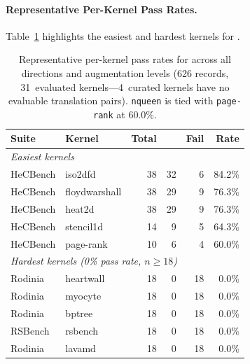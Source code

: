 \paragraph{Representative Per-Kernel Pass Rates.}
Table~\ref{tab:per-kernel-main} highlights the easiest and hardest kernels for \qwenshort{}.
\begin{table}[h]
\centering
\caption{Representative per-kernel pass rates for \qwenshort{} across all directions and augmentation levels (626 records, 31~evaluated kernels---4~curated kernels have no evaluable translation pairs). \texttt{nqueen} is tied with \texttt{page-rank} at 60.0\%.}
\label{tab:per-kernel-main}
\small
\begin{tabular}{@{}llrrrr@{}}
\toprule
Suite & Kernel & Total & \pass{} & Fail & Rate \\
\midrule
\multicolumn{6}{l}{\textit{Easiest kernels}} \\
HeCBench & iso2dfd & 38 & 32 & 6 & 84.2\% \\
HeCBench & floydwarshall & 38 & 29 & 9 & 76.3\% \\
HeCBench & heat2d & 38 & 29 & 9 & 76.3\% \\
HeCBench & stencil1d & 14 & 9 & 5 & 64.3\% \\
HeCBench & page-rank & 10 & 6 & 4 & 60.0\% \\
\midrule
\multicolumn{6}{l}{\textit{Hardest kernels (0\% pass rate, $n \geq 18$)}} \\
Rodinia & heartwall & 18 & 0 & 18 & 0.0\% \\
Rodinia & myocyte & 18 & 0 & 18 & 0.0\% \\
Rodinia & bptree & 18 & 0 & 18 & 0.0\% \\
RSBench & rsbench & 18 & 0 & 18 & 0.0\% \\
Rodinia & lavamd & 18 & 0 & 18 & 0.0\% \\
\bottomrule
\end{tabular}
\end{table}

